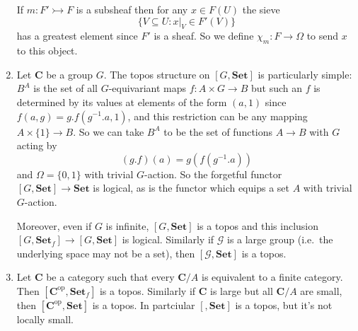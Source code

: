 \documentclass[a4paper]{article}
\renewcommand{\c}[1]{\mathbf{#1}}
\newcommand{\Set}{{\c{Set}}}
\newcommand{\mono}{\rightarrowtail}
\begin{document}
\begin{eg}
\begin{enumerate}
    If \(m: F' \mono F\) is a subsheaf then for any \(x \in F(U)\) the sieve
    \[
      \{V \subseteq U: x|_V \in F'(V)\}
    \]
    has a greatest element since \(F'\) is a sheaf. So we define \(\chi_m: F \to \Omega\) to send \(x\) to this object.
  \item Let \(\c C\) be a group \(G\). The topos structure on \([G, \Set]\) is particularly simple: \(B^A\) is the set of all \(G\)-equivariant maps \(f: A \times G \to B\) but such an \(f\) is determined by its values at elements of the form \((a, 1)\) since \(f(a, g) = g . f(g^{-1} . a, 1)\), and this restriction can be any mapping \(A \times \{1\} \to B\). So we can take \(B^A\) to be the set of functions \(A \to B\) with \(G\) acting by
    \[
      (g . f) (a) = g(f(g^{-1} . a))
    \]
    and \(\Omega = \{0, 1\}\) with trivial \(G\)-action. So the forgetful functor \([G, \Set] \to \Set\) is logical, as is the functor which equips a set \(A\) with trivial \(G\)-action.

    Moreover, even if \(G\) is infinite, \([G, \Set]\) is a topos and this inclusion \([G, \Set_f] \to [G, \Set]\) is logical. Similarly if \(\mathcal G\) is a large group (i.e.\ the underlying space may not be a set), then \([\mathcal G, \Set]\) is a topos.
  \item Let \(\c C\) be a category such that every \(\c C/A\) is equivalent to a finite category. Then \([\c C^{\text{op}}, \Set_f]\) is a topos. Similarly if \(\c C\) is large but all \(\c C/A\) are small, then \([\c C^{\text{op}}, \Set]\) is a topos. In partciular \([, \Set]\) is a topos, but it's not locally small.
  \end{enumerate}
\end{eg}


\printindex
\end{document}

